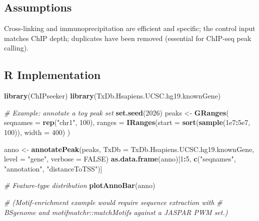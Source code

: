 \documentclass[
]{article}
\newenvironment{Shaded}{\begin{snugshade}}{\end{snugshade}}
\newcommand{\AttributeTok}[1]{\textcolor[rgb]{0.13,0.29,0.53}{#1}}
\newcommand{\CommentTok}[1]{\textcolor[rgb]{0.56,0.35,0.01}{\textit{#1}}}
\newcommand{\ConstantTok}[1]{\textcolor[rgb]{0.56,0.35,0.01}{#1}}
\newcommand{\DecValTok}[1]{\textcolor[rgb]{0.00,0.00,0.81}{#1}}
\newcommand{\FloatTok}[1]{\textcolor[rgb]{0.00,0.00,0.81}{#1}}
\newcommand{\FunctionTok}[1]{\textcolor[rgb]{0.13,0.29,0.53}{\textbf{#1}}}
\newcommand{\NormalTok}[1]{#1}
\newcommand{\OtherTok}[1]{\textcolor[rgb]{0.56,0.35,0.01}{#1}}
\newcommand{\SpecialCharTok}[1]{\textcolor[rgb]{0.81,0.36,0.00}{\textbf{#1}}}
\newcommand{\StringTok}[1]{\textcolor[rgb]{0.31,0.60,0.02}{#1}}
\begin{document}
\subsection{Assumptions}\label{assumptions}

Cross-linking and immunoprecipitation are efficient and specific; the
control input matches ChIP depth; duplicates have been removed
(essential for ChIP-seq peak calling).

\subsection{R Implementation}\label{r-implementation}

\begin{Shaded}
\begin{Highlighting}[]
\FunctionTok{library}\NormalTok{(ChIPseeker)}
\FunctionTok{library}\NormalTok{(TxDb.Hsapiens.UCSC.hg19.knownGene)}

\CommentTok{\# Example: annotate a toy peak set}
\FunctionTok{set.seed}\NormalTok{(}\DecValTok{2026}\NormalTok{)}
\NormalTok{peaks }\OtherTok{\textless{}{-}} \FunctionTok{GRanges}\NormalTok{(}
  \AttributeTok{seqnames =} \FunctionTok{rep}\NormalTok{(}\StringTok{"chr1"}\NormalTok{, }\DecValTok{100}\NormalTok{),}
  \AttributeTok{ranges =} \FunctionTok{IRanges}\NormalTok{(}\AttributeTok{start =} \FunctionTok{sort}\NormalTok{(}\FunctionTok{sample}\NormalTok{(}\FloatTok{1e7}\SpecialCharTok{:}\FloatTok{5e7}\NormalTok{, }\DecValTok{100}\NormalTok{)), }\AttributeTok{width =} \DecValTok{400}\NormalTok{)}
\NormalTok{)}

\NormalTok{anno }\OtherTok{\textless{}{-}} \FunctionTok{annotatePeak}\NormalTok{(peaks,}
                     \AttributeTok{TxDb =}\NormalTok{ TxDb.Hsapiens.UCSC.hg19.knownGene,}
                     \AttributeTok{level =} \StringTok{"gene"}\NormalTok{,}
                     \AttributeTok{verbose =} \ConstantTok{FALSE}\NormalTok{)}
\FunctionTok{as.data.frame}\NormalTok{(anno)[}\DecValTok{1}\SpecialCharTok{:}\DecValTok{5}\NormalTok{, }\FunctionTok{c}\NormalTok{(}\StringTok{"seqnames"}\NormalTok{, }\StringTok{"annotation"}\NormalTok{, }\StringTok{"distanceToTSS"}\NormalTok{)]}

\CommentTok{\# Feature{-}type distribution}
\FunctionTok{plotAnnoBar}\NormalTok{(anno)}

\CommentTok{\# (Motif{-}enrichment example would require sequence extraction with}
\CommentTok{\#  BSgenome and motifmatchr::matchMotifs against a JASPAR PWM set.)}
\end{Highlighting}
\end{Shaded}
\end{document}
